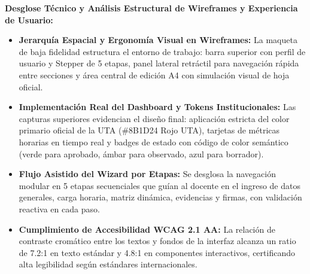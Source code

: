 \documentclass[12pt,a4paper]{article}
\begin{document}
\noindent
\noindent
\textbf{Desglose Técnico y Análisis Estructural de Wireframes y Experiencia de Usuario:}
\begin{itemize}[leftmargin=1.5em, itemsep=3pt]
    \item \textbf{Jerarquía Espacial y Ergonomía Visual en Wireframes:} La maqueta de baja fidelidad estructura el entorno de trabajo: barra superior con perfil de usuario y Stepper de 5 etapas, panel lateral retráctil para navegación rápida entre secciones y área central de edición A4 con simulación visual de hoja oficial.
    \item \textbf{Implementación Real del Dashboard y Tokens Institucionales:} Las capturas superiores evidencian el diseño final: aplicación estricta del color primario oficial de la UTA (\#8B1D24 Rojo UTA), tarjetas de métricas horarias en tiempo real y badges de estado con código de color semántico (verde para aprobado, ámbar para observado, azul para borrador).
    \item \textbf{Flujo Asistido del Wizard por Etapas:} Se desglosa la navegación modular en 5 etapas secuenciales que guían al docente en el ingreso de datos generales, carga horaria, matriz dinámica, evidencias y firmas, con validación reactiva en cada paso.
    \item \textbf{Cumplimiento de Accesibilidad WCAG 2.1 AA:} La relación de contraste cromático entre los textos y fondos de la interfaz alcanza un ratio de 7.2:1 en texto estándar y 4.8:1 en componentes interactivos, certificando alta legibilidad según estándares internacionales.
\end{itemize}
\end{document}
